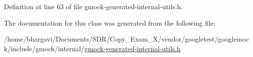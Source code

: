 Definition at line 63 of file gmock-\/generated-\/internal-\/utils.\+h.



The documentation for this class was generated from the following file\+:\begin{DoxyCompactItemize}
\item 
/home/bhargavi/\+Documents/\+S\+D\+R/\+Copy\+\_\+\+Exam\+\_\+X/vendor/googletest/googlemock/include/gmock/internal/\hyperlink{gmock-generated-internal-utils_8h}{gmock-\/generated-\/internal-\/utils.\+h}\end{DoxyCompactItemize}
